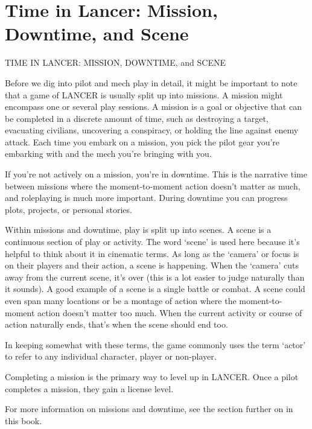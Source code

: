 \chapter{Time in Lancer: Mission, Downtime, and Scene}
               TIME IN LANCER: MISSION, DOWNTIME, and SCENE

Before we dig into pilot and mech play in detail, it might be important to note that a game of
LANCER is usually split up into missions. A mission might encompass one or several play
sessions. A mission is a goal or objective that can be completed in a discrete amount of time,
such as destroying a target, evacuating civilians, uncovering a conspiracy, or holding the line
against enemy attack. Each time you embark on a mission, you pick the pilot gear you’re
embarking with and the mech you’re bringing with you.

If you’re not actively on a mission, you’re in downtime. This is the narrative time between
missions where the moment-to-moment action doesn’t matter as much, and roleplaying is much
more important. During downtime you can progress plots, projects, or personal stories.

Within missions and downtime, play is split up into scenes. A scene is a continuous section of
play or activity. The word ‘scene’ is used here because it’s helpful to think about it in cinematic
terms. As long as the ‘camera’ or focus is on their players and their action, a scene is happening.
When the ‘camera’ cuts away from the current scene, it’s over (this is a lot easier to judge
naturally than it sounds). A good example of a scene is a single battle or combat. A scene could
even span many locations or be a montage of action where the moment-to-moment action
doesn’t matter too much. When the current activity or course of action naturally ends, that’s
when the scene should end too.

In keeping somewhat with these terms, the game commonly uses the term ‘actor’ to refer to any
individual character, player or non-player.




Completing a mission is the primary way to level up in LANCER. Once a pilot completes a
mission, they gain a license level.


For more information on missions and downtime, see the section further on in this book.
